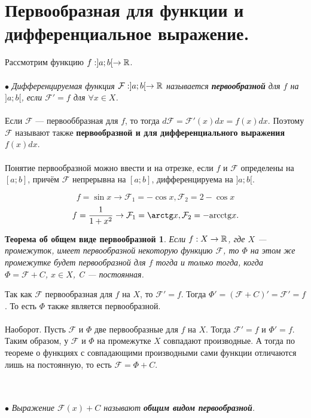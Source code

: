 \section{Первообразная для функции и дифференциальное выражение.}
Рассмотрим функцию $ f: ]a;b[\rightarrow \mathbb{R} $.\\\\
$\bullet$ \textit{Дифференцируемая функция $\mathcal{F}:]a;b[\rightarrow \mathbb{R}$ называется \textbf{первообразной} для $f$ на $]a;b[$, если $\mathcal{F}'=f$ для $\forall x \in X$.}\\\\
Если $\mathcal{F}$ --- первооббразная для $f$, то тогда $d\mathcal{F} = \mathcal{F}'(x)dx = f(x)dx$. Поэтому $\mathcal{F}$ называют также \textbf{первообразной и для дифференциального выражения} $f(x)dx$.\\\\
Понятие первообразной можно ввести и на отрезке, если $f$ и $\mathcal{F}$ определены на $[a;b]$, причём $\mathcal{F}$ непрерывна на $[a;b]$, дифференцируема на $]a;b[$.\\
\begin{example}
	$$f=\sin x \rightarrow \mathcal{F}_1 = -\cos x, \mathcal{F}_2 = 2-\cos x$$
	$$f=\frac{1}{1 + x^2} \rightarrow \mathcal{F}_1 = \arctg x, \mathcal{F}_2 = - \mathrm{arcctg}x.$$
\end{example}
\newtheorem*{thoovp}{Теорема об общем виде первообразной}
\begin{thoovp}
	Если $f : X \rightarrow \mathbb{R} $, где $X$ --- промежуток, имеет первообразной некоторую функцию $\mathcal{F}$, то $\Phi$ на этом же промежутке будет первообразной для $f$ тогда и только тогда, когда $\Phi = \mathcal{F} + C$, $x \in X$, C --- постоянная. 
\end{thoovp}
\begin{Proof}
	Так как $\mathcal{F}$ первообразная для $f$ на $X$, то $\mathcal{F}' = f$. Тогда $\Phi ' = (\mathcal{F} + C)' = \mathcal{F}' = f$. То есть $\Phi$ также является первообразной.\\\\
	Наоборот. Пусть $\mathcal{F}$ и $\Phi$ две первообразные для $f$ на $X$. Тогда $\mathcal{F}' = f$ и $\Phi ' = f$. Таким образом, у $\mathcal{F}$ и $\Phi$ на промежутке $X$ совпадают производные. А тогда по теореме о функциях с совпадающими производными сами функции отличаются лишь на постоянную, то есть $\mathcal{F} = \Phi + C$.
\end{Proof}\\\\
$\bullet$ \textit{Выражение $\mathcal{F}(x) + C$ называют \textbf{общим видом первообразной}.}